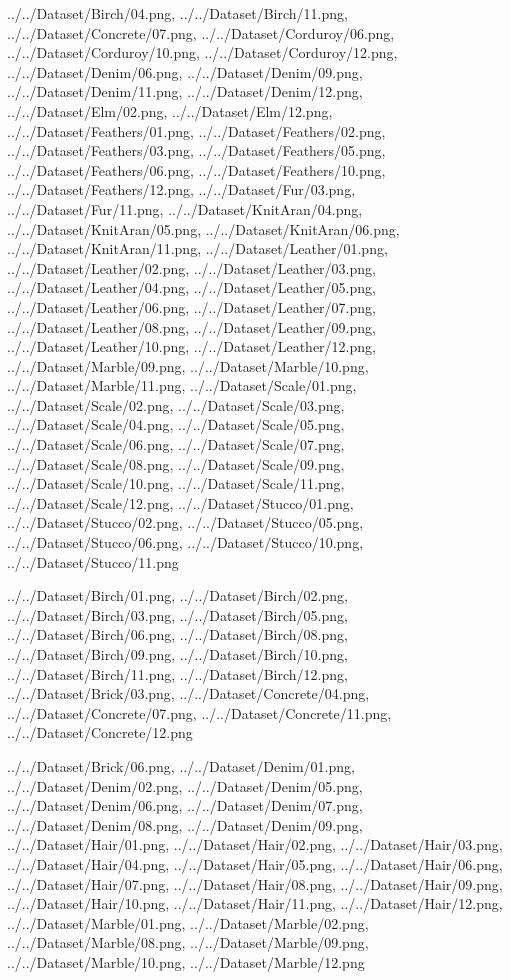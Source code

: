 \documentclass[12pt,a4paper]{article}
\begin{document}
\begin{singlespace}
{../../Dataset/Birch/04.png,
../../Dataset/Birch/11.png,
../../Dataset/Concrete/07.png,
../../Dataset/Corduroy/06.png,
../../Dataset/Corduroy/10.png,
../../Dataset/Corduroy/12.png,
../../Dataset/Denim/06.png,
../../Dataset/Denim/09.png,
../../Dataset/Denim/11.png,
../../Dataset/Denim/12.png,
../../Dataset/Elm/02.png,
../../Dataset/Elm/12.png,
../../Dataset/Feathers/01.png,
../../Dataset/Feathers/02.png,
../../Dataset/Feathers/03.png,
../../Dataset/Feathers/05.png,
../../Dataset/Feathers/06.png,
../../Dataset/Feathers/10.png,
../../Dataset/Feathers/12.png,
../../Dataset/Fur/03.png,
../../Dataset/Fur/11.png,
../../Dataset/KnitAran/04.png,
../../Dataset/KnitAran/05.png,
../../Dataset/KnitAran/06.png,
../../Dataset/KnitAran/11.png,
../../Dataset/Leather/01.png,
../../Dataset/Leather/02.png,
../../Dataset/Leather/03.png,
../../Dataset/Leather/04.png,
../../Dataset/Leather/05.png,
../../Dataset/Leather/06.png,
../../Dataset/Leather/07.png,
../../Dataset/Leather/08.png,
../../Dataset/Leather/09.png,
../../Dataset/Leather/10.png,
../../Dataset/Leather/12.png,
../../Dataset/Marble/09.png,
../../Dataset/Marble/10.png,
../../Dataset/Marble/11.png,
../../Dataset/Scale/01.png,
../../Dataset/Scale/02.png,
../../Dataset/Scale/03.png,
../../Dataset/Scale/04.png,
../../Dataset/Scale/05.png,
../../Dataset/Scale/06.png,
../../Dataset/Scale/07.png,
../../Dataset/Scale/08.png,
../../Dataset/Scale/09.png,
../../Dataset/Scale/10.png,
../../Dataset/Scale/11.png,
../../Dataset/Scale/12.png,
../../Dataset/Stucco/01.png,
../../Dataset/Stucco/02.png,
../../Dataset/Stucco/05.png,
../../Dataset/Stucco/06.png,
../../Dataset/Stucco/10.png,
../../Dataset/Stucco/11.png}

{../../Dataset/Birch/01.png,
../../Dataset/Birch/02.png,
../../Dataset/Birch/03.png,
../../Dataset/Birch/05.png,
../../Dataset/Birch/06.png,
../../Dataset/Birch/08.png,
../../Dataset/Birch/09.png,
../../Dataset/Birch/10.png,
../../Dataset/Birch/11.png,
../../Dataset/Birch/12.png,
../../Dataset/Brick/03.png,
../../Dataset/Concrete/04.png,
../../Dataset/Concrete/07.png,
../../Dataset/Concrete/11.png,
../../Dataset/Concrete/12.png}

{../../Dataset/Brick/06.png,
../../Dataset/Denim/01.png,
../../Dataset/Denim/02.png,
../../Dataset/Denim/05.png,
../../Dataset/Denim/06.png,
../../Dataset/Denim/07.png,
../../Dataset/Denim/08.png,
../../Dataset/Denim/09.png,
../../Dataset/Hair/01.png,
../../Dataset/Hair/02.png,
../../Dataset/Hair/03.png,
../../Dataset/Hair/04.png,
../../Dataset/Hair/05.png,
../../Dataset/Hair/06.png,
../../Dataset/Hair/07.png,
../../Dataset/Hair/08.png,
../../Dataset/Hair/09.png,
../../Dataset/Hair/10.png,
../../Dataset/Hair/11.png,
../../Dataset/Hair/12.png,
../../Dataset/Marble/01.png,
../../Dataset/Marble/02.png,
../../Dataset/Marble/08.png,
../../Dataset/Marble/09.png,
../../Dataset/Marble/10.png,
../../Dataset/Marble/12.png}


\end{singlespace}
\end{document}
